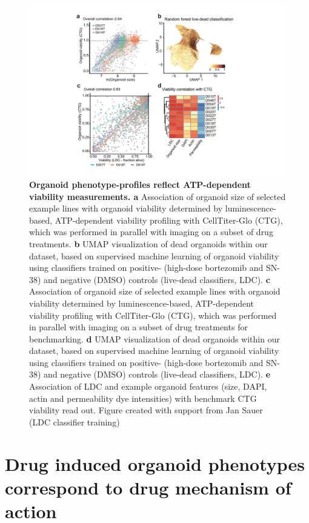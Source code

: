 \begin{flushleft}
\clearpage
\begin{figure}[h]
\centering
\includegraphics[width=\textwidth,
                height=\textheight,
                keepaspectratio]{figures/promise/pdf/fig_2_3.pdf}
\caption{\textbf{Organoid phenotype-profiles reflect ATP-dependent viability measurements. a} Association of organoid size of selected example lines with organoid viability determined by luminescence-based, ATP-dependent viability profiling with CellTiter-Glo (CTG), which was performed in parallel with imaging on a subset of drug treatments. \textbf{b} UMAP visualization of dead organoids within our dataset, based on supervised machine learning of organoid viability using classifiers trained on positive- (high-dose bortezomib and SN-38) and negative (DMSO) controls (live-dead classifiers, LDC). \textbf{c} Association of organoid size of selected example lines with organoid viability determined by luminescence-based, ATP-dependent viability profiling with CellTiter-Glo (CTG), which was performed in parallel with imaging on a subset of drug treatments for benchmarking. \textbf{d} UMAP visualization of dead organoids within our dataset, based on supervised machine learning of organoid viability using classifiers trained on positive- (high-dose bortezomib and SN-38) and negative (DMSO) controls (live-dead classifiers, LDC). \textbf{e} Association of LDC and example organoid features (size, DAPI, actin and permeability dye intensities) with benchmark CTG viability read out. Figure created with support from Jan Sauer (LDC classifier training)}
\label{fig_223}
\end{figure}
\bigbreak

\section{Drug induced organoid phenotypes correspond to drug mechanism of action}


\end{flushleft}
